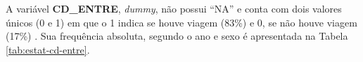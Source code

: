 \begin{table}[htb]

\end{table}

A variável \textbf{CD_ENTRE}, \textit{dummy}, não possui ``NA'' e conta com dois valores únicos (0 e 1) em que o 1 indica se houve viagem (83\%) e 0, se não houve viagem (17\%) . Sua frequência absoluta, segundo o ano e sexo é apresentada na Tabela \ref{tab:estat-cd-entre}. 

